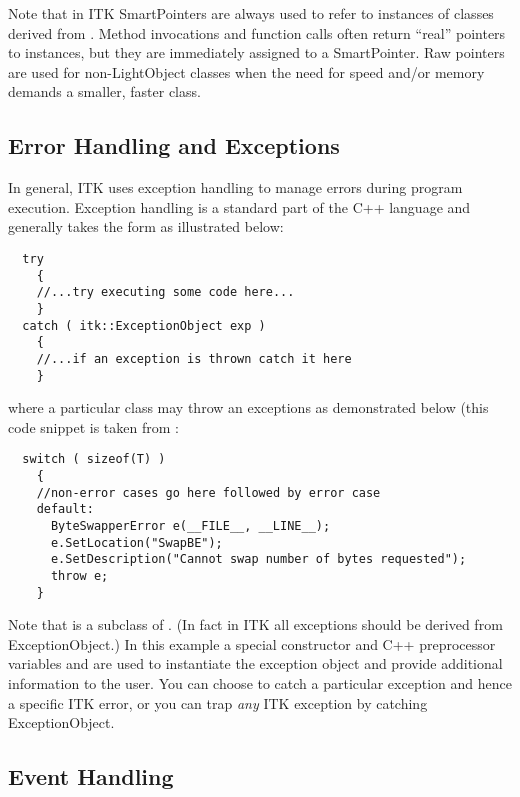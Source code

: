 Note that in ITK SmartPointers are always used to refer to instances of
classes derived from . Method invocations and function
calls often return ``real'' pointers to instances, but they are immediately
assigned to a SmartPointer. Raw pointers are used for non-LightObject classes when
the need for speed and/or memory demands a smaller, faster class.


\subsection{Error Handling and Exceptions}
\label{sec:ErrorHandling}


In general, ITK uses exception handling to manage errors during program
execution. Exception handling is a standard part of the C++ language and
generally takes the form as illustrated below:
\small
\begin{verbatim}
  try
    {
    //...try executing some code here...
    }
  catch ( itk::ExceptionObject exp )
    {
    //...if an exception is thrown catch it here
    }
\end{verbatim}
\normalsize

where a particular class may throw an exceptions as demonstrated below (this
code snippet is taken from :
\small
\begin{verbatim}
  switch ( sizeof(T) )
    {
    //non-error cases go here followed by error case  
    default:  
      ByteSwapperError e(__FILE__, __LINE__);
      e.SetLocation("SwapBE");
      e.SetDescription("Cannot swap number of bytes requested");
      throw e;
    }
\end{verbatim}
\normalsize

Note that  is a subclass of
. (In fact in ITK all exceptions should be derived
from ExceptionObject.) In this example a special constructor and C++
preprocessor variables  and  are used to instantiate
the exception object and provide additional information to the user. You can
choose to catch a particular exception and hence a specific ITK error, or you
can trap \emph{any} ITK exception by catching ExceptionObject.


\subsection{Event Handling}
\label{sec:EventHandling}


